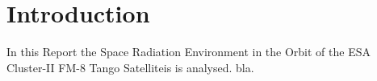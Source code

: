 \section{Introduction}

In this Report the Space Radiation Environment in the Orbit of the ESA Cluster-II FM-8 Tango Satelliteis is analysed.
bla.